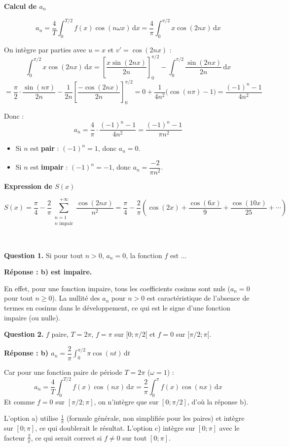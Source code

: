 \documentclass[11pt,a4paper]{article}
\newcommand{\cor}[1]{%
  \begin{tcolorbox}[
    colback=blue!5!white,
    colframe=blue!70!black,
    boxrule=1pt,
    arc=3pt,
    left=4pt, right=4pt, top=3pt, bottom=3pt,
    before skip=2mm, after skip=3mm
  ]
  \color{blue!80!black}#1
  \end{tcolorbox}%
}
\begin{document}
\textbf{Calcul de $a_n$}

\cor{
$$a_n = \frac{4}{T}\int_0^{T/2} f(x)\cos(n\omega x)\,\mathrm{d}x
= \frac{4}{\pi}\int_0^{\pi/2} x\cos(2nx)\,\mathrm{d}x$$

On intègre par parties avec $u=x$ et $v'=\cos(2nx)$ :
$$\int_0^{\pi/2} x\cos(2nx)\,\mathrm{d}x
= \left[\frac{x\sin(2nx)}{2n}\right]_0^{\pi/2} - \int_0^{\pi/2}\frac{\sin(2nx)}{2n}\,\mathrm{d}x$$
$$= \frac{\pi}{2}\cdot\frac{\sin(n\pi)}{2n} - \frac{1}{2n}\left[\frac{-\cos(2nx)}{2n}\right]_0^{\pi/2}
= 0 + \frac{1}{4n^2}\bigl(\cos(n\pi)-1\bigr)
= \frac{(-1)^n-1}{4n^2}$$

Donc :
$$a_n = \frac{4}{\pi}\cdot\frac{(-1)^n-1}{4n^2} = \frac{(-1)^n-1}{\pi n^2}$$

\begin{itemize}
  \item Si $n$ est \textbf{pair} : $(-1)^n=1$, donc $a_n=0$.
  \item Si $n$ est \textbf{impair} : $(-1)^n=-1$, donc $a_n=\dfrac{-2}{\pi n^2}$.
\end{itemize}
}

\textbf{Expression de $S(x)$}

\cor{
$$\boxed{S(x) = \frac{\pi}{4} - \frac{2}{\pi}\sum_{\substack{n=1\\n\text{ impair}}}^{+\infty}\frac{\cos(2nx)}{n^2}
= \frac{\pi}{4} - \frac{2}{\pi}\left(\cos(2x)+\frac{\cos(6x)}{9}+\frac{\cos(10x)}{25}+\cdots\right)}$$
}

\newpage
\\[2mm]

\cor{
\textbf{Question 1.} Si pour tout $n>0$, $a_n=0$, la fonction $f$ est $\ldots$

\textbf{Réponse : b) est impaire.}

En effet, pour une fonction impaire, tous les coefficients cosinus sont nuls ($a_n=0$ pour tout $n\geqslant 0$). La nullité des $a_n$ pour $n>0$ est caractéristique de l'absence de termes en cosinus dans le développement, ce qui est le signe d'une fonction impaire (ou nulle).
}

\vfill 


\cor{
\textbf{Question 2.} $f$ paire, $T=2\pi$, $f=\pi$ sur $[0;\pi/2[$ et $f=0$ sur $[\pi/2;\pi[$.

\textbf{Réponse : b) $a_n=\dfrac{2}{\pi}\displaystyle\int_0^{\pi/2}\pi\cos(nt)\,\mathrm{d}t$}

Car pour une fonction paire de période $T=2\pi$ ($\omega=1$) :
$$a_n = \frac{4}{T}\int_0^{T/2}f(x)\cos(nx)\,\mathrm{d}x = \frac{2}{\pi}\int_0^{\pi}f(x)\cos(nx)\,\mathrm{d}x$$
Et comme $f=0$ sur $[\pi/2;\pi]$, on n'intègre que sur $[0;\pi/2]$, d'où la réponse b).

L'option a) utilise $\frac{1}{\pi}$ (formule générale, non simplifiée pour les paires) et intègre sur $[0;\pi]$, ce qui doublerait le résultat.
L'option c) intègre sur $[0;\pi]$ avec le facteur $\frac{2}{\pi}$, ce qui serait correct si $f\neq 0$ sur tout $[0;\pi]$.
}
\end{document}
